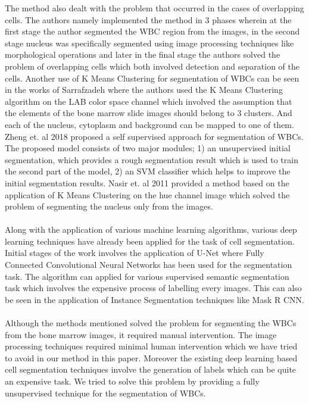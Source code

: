 \documentclass[conference]{IEEEtran}
\begin{document}
The method also dealt with the problem that occurred in the cases of overlapping cells.
The authors namely implemented the method in 3 phases wherein at the first stage the author segmented the WBC region from the images, in the second stage nucleus was specifically segmented using image processing techniques like morphological operations and later in the final stage the authors solved the problem of overlapping cells which both involved detection and separation of the cells. 
Another use of K Means Clustering for segmentation of WBCs can be seen in the works of Sarrafzadeh \cite{17} where the authors used the  K Means Clustering algorithm on the LAB color space channel which involved the assumption that the elements of the bone marrow slide images should belong to 3 clusters. And each of the nucleus, cytoplasm and background can be mapped to one of them. Zheng et. al 2018 \cite{18} proposed a  self supervised approach for segmentation of WBCs. The proposed model consists of two major modules; 1) an unsupervised initial segmentation, which provides a rough segmentation result which is used to train the second part of the model, 2) an SVM classifier which helps to improve the initial segmentation results. Nasir et. al 2011\cite{19} provided a method based on the application of K Means Clustering on the hue channel image which solved the problem of segmenting the nucleus only from the images.
\\
\\
Along with the application of various machine learning algorithms, various deep learning techniques have already been applied for the task of cell segmentation. Initial stages of the work involves the application of U-Net \cite{20} where  Fully Connected Convolutional Neural Networks has been used for the segmentation task. The algorithm can applied for various supervised semantic segmentation task which involves the expensive process of labelling every images. This can also be seen in the application of Instance Segmentation techniques like Mask R CNN\cite{21}.
\\
\\
Although the methods mentioned solved the problem for segmenting the WBCs from the bone marrow images, it required manual intervention. The image processing techniques required minimal human intervention which we have tried to avoid in our method in this paper. Moreover the existing deep learning based cell segmentation techniques involve the generation of labels which can be quite an expensive task. We tried to solve this problem by providing a fully unsupervised technique for the segmentation of WBCs. 
\end{document}
